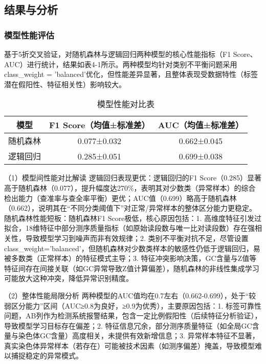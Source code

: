 \documentclass[withoutpreface,bwprint]{cumcmthesis} %
\begin{document}
\subsection{结果与分析}
\subsubsection{模型性能评估}
基于5折交叉验证，对随机森林与逻辑回归两种模型的核心性能指标（F1 Score、AUC）进行统计，结果如表4-1所示。两种模型均针对类别不平衡问题采用class\_weight = 'balanced'优化，但性能差异显著，且整体表现受数据特性（标签潜在假阳性、特征相关性）影响较大。


\begin{table}[H]
    \centering  %
    \caption{模型性能对比表}  %
    \label{tab:模型性能对比表}  %
    \begin{threeparttable}
        \begin{tabularx}{0.75\textwidth}{c c c}
            \toprule[1.5pt]
            \textbf{模型} & \textbf{F1 Score（均值±标准差）} & \textbf{AUC（均值±标准差）} \\ 
            \midrule[1pt]
            随机森林 & 0.077±0.032 & 0.662±0.045 \\
            逻辑回归 & 0.285±0.051 & 0.699±0.038 \\

            \bottomrule[1.5pt]
        
        \end{tabularx}
    \end{threeparttable}
\end{table}

（1）模型间性能对比解读
逻辑回归表现更优：逻辑回归的F1 Score（0.285）显著高于随机森林（0.077），提升幅度达270\%，表明其对少数类（异常样本）的综合检出能力（查准率与查全率平衡）更优；AUC值（0.699）略高于随机森林（0.662），说明其在“不同分类阈值下”对正常/异常样本的整体区分能力更稳定。  
随机森林性能短板：随机森林F1 Score极低，核心原因包括：1. 高维度特征引发过拟合，18维特征中部分测序质量指标（如原始读段数与唯一比对读段数）存在强相关性，导致模型学习到噪声而非有效规律；2. 类别不平衡对抗不足，尽管设置class\_weight='balanced'，但随机森林对少数类样本的敏感性仍低于逻辑回归，易被多数类（正常样本）的特征模式主导；3. 特征冲突影响决策，GC含量与Z值等特征间存在间接关联（如GC异常导致Z值计算偏差），随机森林的非线性集成学习可能放大这种冲突，降低异常识别精度。

（2）整体性能局限分析
两种模型的AUC值均在0.7左右（0.662-0.699），处于“较弱区分能力”区间（AUC≥0.8为良好，≥0.9为优秀），主要原因包括：1. 标签可靠性问题，AB列作为检测系统报警结果，包含一定比例假阳性（后续特征分析验证），导致模型学习目标存在偏差；2. 特征信息冗余，部分测序质量特征（如全局GC含量与染色体GC含量）高度相关，未提供有效新增信息；3. 异常样本特征不显著，真实染色体异常样本（若存在）可能被技术因素（如测序偏差）掩盖，导致模型难以捕捉稳定的异常模式。
\end{document}
